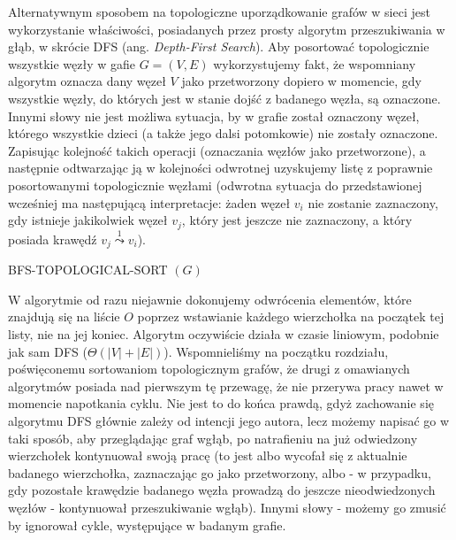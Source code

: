 Alternatywnym sposobem na topologiczne uporządkowanie grafów w sieci jest wykorzystanie właściwości, posiadanych przez prosty algorytm przeszukiwania w głąb, w skrócie \textsf{DFS} (ang. \textit{Depth-First Search}). Aby posortować topologicznie wszystkie węzły w gafie $G = \left( V, E \right)$ wykorzystujemy fakt, że wspomniany algorytm oznacza dany węzeł $V$ jako przetworzony dopiero w momencie, gdy wszystkie węzły, do których jest w stanie dojść z badanego węzła, są oznaczone. Innymi słowy nie jest możliwa sytuacja, by w grafie został oznaczony węzeł, którego wszystkie dzieci (a także jego dalsi potomkowie) nie zostały oznaczone. Zapisując kolejność takich operacji (oznaczania węzłów jako przetworzone), a następnie odtwarzając ją w kolejności odwrotnej uzyskujemy listę z poprawnie posortowanymi topologicznie węzłami (odwrotna sytuacja do przedstawionej wcześniej ma następującą interpretacje: żaden węzeł $v_{i}$ nie zostanie zaznaczony, gdy istnieje jakikolwiek węzeł $v_{j}$, który jest jeszcze nie zaznaczony, a który posiada krawędź $v_{j} \overset{1} \leadsto v_{i}$).

\begin{algorithm}[!htbp]
\DontPrintSemicolon
{}
\caption{ BFS-TOPOLOGICAL-SORT $\left( G \right)$\label{alg:BFSTopologicalSort}}
\end{algorithm}

W algorytmie od razu niejawnie dokonujemy odwrócenia elementów, które znajdują się na liście $O$ poprzez wstawianie każdego wierzchołka na początek tej listy, nie na jej koniec. Algorytm oczywiście działa w czasie liniowym, podobnie jak sam \textsf{DFS} ($ \Theta \left( \left| V \right| + \left| E \right| \right)$). Wspomnieliśmy na początku rozdziału, poświęconemu sortowaniom topologicznym grafów, że drugi z omawianych algorytmów posiada nad pierwszym tę przewagę, że nie przerywa pracy nawet w momencie napotkania cyklu. Nie jest to do końca prawdą, gdyż zachowanie się algorytmu \textsf{DFS} głównie zależy od intencji jego autora, lecz możemy napisać go w taki sposób, aby przeglądając graf wgłąb, po natrafieniu na już odwiedzony wierzchołek kontynuował swoją pracę (to jest albo wycofał się z aktualnie badanego wierzchołka, zaznaczając go jako przetworzony, albo - w przypadku, gdy pozostałe krawędzie badanego węzła prowadzą do jeszcze nieodwiedzonych węzłów - kontynuował przeszukiwanie wgłąb). Innymi słowy - możemy go zmusić by ignorował cykle, występujące w badanym grafie.

